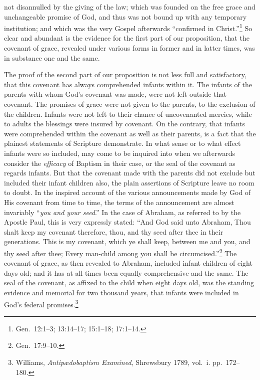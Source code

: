 \documentclass[
  english,
]{book}
\begin{document}
not disannulled by the giving of the law; which was founded on the free grace and unchangeable promise of God, and thus was not bound up with any temporary institution; and which was the very Gospel afterwards ``confirmed in Christ.''\footnote{Gen.~12:1--3; 13:14--17; 15:1--18; 17:1--14.} So clear and abundant is the evidence for the first part of our proposition, that the covenant of grace, revealed under various forms in former and in latter times, was in substance one and the same.

The proof of the second part of our proposition is not less full and satisfactory, that this covenant has always comprehended infants within it. The infants of the parents with whom God's covenant was made, were not left outside that covenant. The promises of grace were not given to the parents, to the exclusion of the children. Infants were not left to their chance of uncovenanted mercies, while to adults the blessings were insured by covenant. On the contrary, that infants were comprehended within the covenant as well as their parents, is a fact that the plainest statements of Scripture demonstrate. In what sense or to what effect infants were so included, may come to be inquired into when we afterwards consider the \emph{efficacy} of Baptism in their case, or the seal of the covenant as regards infants. But that the covenant made with the parents did not exclude but included their infant children also, the plain assertions of Scripture leave no room to doubt. In the inspired account of the various announcements made by God of His covenant from time to time, the terms of the announcement are almost invariably ``\emph{you and your seed}.'' In the case of Abraham, as referred to by the Apostle Paul, this is very expressly stated: ``And God said unto Abraham, Thou shalt keep my covenant therefore, thou, and thy seed after thee in their generations. This is my covenant, which ye shall keep, between me and you, and thy seed after thee; Every man-child among you shall be circumcised.''\footnote{Gen.~17:9--10.} The covenant of grace, as then revealed to Abraham, included infant children of eight days old; and it has at all times been equally comprehensive and the same. The seal of the covenant, as affixed to the child when eight days old, was the standing evidence and memorial for two thousand years, that infants were included in God's federal promises.\footnote{Williams, \emph{Antipædobaptism Examined}, Shrewsbury 1789, vol.~i. pp.~172--180.}
\end{document}
